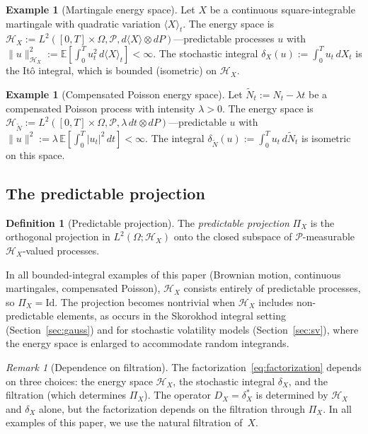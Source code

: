 \documentclass[11pt,a4paper]{article}
\theoremstyle{plain}
\theoremstyle{definition}
\newtheorem{definition}[theorem]{Definition}
\newtheorem{example}[theorem]{Example}
\theoremstyle{remark}
\newtheorem{remark}[theorem]{Remark}
\newcommand{\E}{\mathbb{E}}
\newcommand{\Id}{\mathrm{Id}}
\newcommand{\HX}{\mathcal{H}_X}
\begin{document}
\begin{example}[Martingale energy space]\label{ex:mart_energy}
Let $X$ be a continuous square-integrable martingale with quadratic variation $\langle X\rangle_t$. The energy space is $\HX := L^2([0,T] \times \Omega, \mathcal{P}, d\langle X\rangle \otimes dP)$---predictable processes $u$ with $\|u\|^2_{\HX} := \E[\int_0^T u_t^2\,d\langle X\rangle_t] < \infty$. The stochastic integral $\delta_X(u) := \int_0^T u_t\,dX_t$ is the It\^o integral, which is bounded (isometric) on $\HX$.
\end{example}

\begin{example}[Compensated Poisson energy space]\label{ex:poiss_energy}
Let $\tilde{N}_t := N_t - \lambda t$ be a compensated Poisson process with intensity $\lambda > 0$. The energy space is $\mathcal{H}_{\tilde{N}} := L^2([0,T] \times \Omega, \mathcal{P}, \lambda\,dt \otimes dP)$---predictable $u$ with $\|u\|^2 := \lambda\,\E[\int_0^T |u_t|^2\,dt] < \infty$. The integral $\delta_{\tilde{N}}(u) := \int_0^T u_t\,d\tilde{N}_t$ is isometric on this space.
\end{example}


\subsection{The predictable projection}

\begin{definition}[Predictable projection]\label{def:pred_proj}
The \emph{predictable projection} $\Pi_X$ is the orthogonal projection in $L^2(\Omega; \HX)$ onto the closed subspace of $\mathcal{P}$-measurable $\HX$-valued processes.
\end{definition}

In all bounded-integral examples of this paper (Brownian motion, continuous martingales, compensated Poisson), $\HX$ consists entirely of predictable processes, so $\Pi_X = \Id$. The projection becomes nontrivial when $\HX$ includes non-predictable elements, as occurs in the Skorokhod integral setting (Section~\ref{sec:gauss}) and for stochastic volatility models (Section~\ref{sec:sv}), where the energy space is enlarged to accommodate random integrands.

\begin{remark}[Dependence on filtration]\label{rem:filtration}
The factorization~\eqref{eq:factorization} depends on three choices: the energy space $\HX$, the stochastic integral $\delta_X$, and the filtration (which determines $\Pi_X$). The operator $D_X = \delta_X^*$ is determined by $\HX$ and $\delta_X$ alone, but the factorization depends on the filtration through $\Pi_X$. In all examples of this paper, we use the natural filtration of~$X$.
\end{remark}
\end{document}
